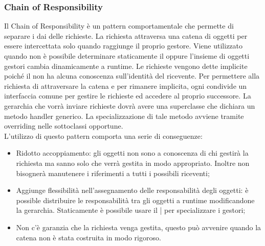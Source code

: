 \documentclass[12pt,a4paper]{article}
\begin{document}
\subsubsection{Chain of Responsibility}
Il Chain of Responsibility è un pattern comportamentale che permette di separare i  dai  delle richieste. La richiesta attraversa una catena di oggetti per essere intercettata solo quando raggiunge il proprio gestore. Viene utilizzato quando non è possibile determinare staticamente il  oppure l’insieme di oggetti gestori cambia dinamicamente a runtime. Le richieste vengono dette implicite poiché il  non ha alcuna conoscenza sull’identità del ricevente. Per permettere alla richiesta di attraversare la catena e per rimanere implicita, ogni  condivide un interfaccia comune per gestire le richieste ed accedere al proprio successore. La gerarchia che vorrà inviare richieste dovrà avere una superclasse che dichiara un metodo handler generico. La specializzazione di tale metodo avviene tramite overriding nelle sottoclassi opportune.\\
L’utilizzo di questo pattern comporta una serie di conseguenze:
\begin{itemize}
	\item Ridotto accoppiamento: gli oggetti non sono a conoscenza di chi gestirà la richiesta ma sanno solo che verrà gestita in modo appropriato. Inoltre non bisognerà manutenere i riferimenti a tutti i possibili riceventi;
	\item Aggiunge flessibilità nell’assegnamento delle responsabilità degli oggetti: è possible distribuire le responsabilità tra gli oggetti a runtime modificandone la gerarchia. Staticamente è possibile usare il | per specializzare i gestori;
	\item Non c’è garanzia che la richiesta venga gestita, questo può avvenire quando la catena non è stata costruita in modo rigoroso.
\end{itemize}
\end{document}
